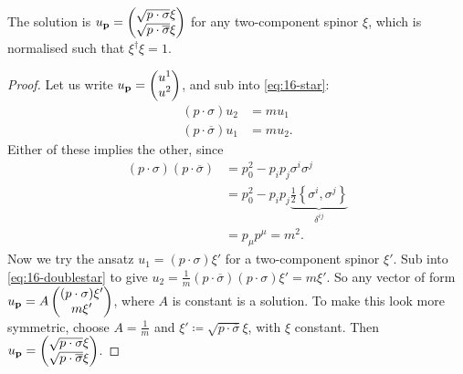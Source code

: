 \begin{claim}
  The solution is $u_{\vb{p}} = 
  \begin{pmatrix}
  \sqrt{p \cdot \sigma} \xi \\
  \sqrt{p \cdot \overline{\sigma}} \xi \\
  \end{pmatrix}$ for any two-component spinor $\xi$, which is normalised such that $\xi^{\dagger} \xi = 1$.
\end{claim}
\begin{proof}
  Let us write $u_{\vb{p}} = 
  \begin{pmatrix}
  u^1 \\
  u^2\\
  \end{pmatrix}$, and sub into \eqref{eq:16-star}:
  \begin{subequations}
    \label{eq:16-doublestar}
    \begin{align}
      (p \cdot \sigma) u_2 &= m u_1 \\
      (p \cdot \overline{\sigma}) u_1 &= m u_2.
    \end{align}
  \end{subequations}
  Either of these implies the other, since
  \begin{align}
    (p \cdot \sigma) (p \cdot \overline{\sigma}) &= p_0^2 - p_{i} p_{j} \sigma^{i} \sigma^{j} \\
						 &= p_0^2 - p_{i} p_{j} \underbrace{\frac{1}{2} \left\{ \sigma^{i}, \sigma^{j} \right\}}_{\delta^{ij}} \\
						 &= p_{\mu} p^{\mu} = m^2.
  \end{align}
  Now we try the ansatz $u_1 = (p \cdot \sigma) \xi'$ for a two-component spinor $\xi'$. Sub into \eqref{eq:16-doublestar} to give $u_2 = \frac{1}{m} (p \cdot \overline{\sigma}) (p \cdot \sigma) \xi' = m \xi'$. So any vector of form $u_{\vb{p}} = A
  \begin{pmatrix}
    (p \cdot \sigma) \xi' \\
    m \xi' \\
  \end{pmatrix}
  $, where $A$ is constant is a solution.
  To make this look more symmetric, choose $A = \frac{1}{m}$ and $\xi' \coloneqq \sqrt{p \cdot \overline{\sigma}}\xi$, with $\xi$ constant. Then $u_{\vb{p}} = 
  \begin{pmatrix}
  \sqrt{p \cdot \sigma} \xi \\
  \sqrt{p \cdot \overline{\sigma}} \xi \\
  \end{pmatrix}
  $.
\end{proof}

